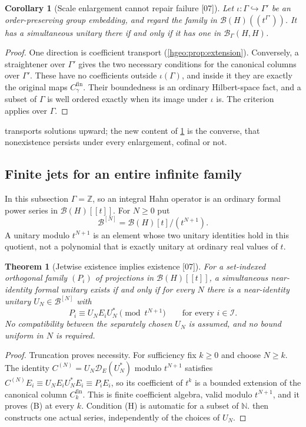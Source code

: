 \documentclass[11pt,letterpaper]{article}
\numberwithin{equation}{section}
\newtheorem{theorem}{Theorem}[section]
\newtheorem{corollary}[corollary]{Corollary}
\theoremstyle{definition}
\theoremstyle{remark}
\newcommand{\Z}{\mathbb Z}
\newcommand{\N}{\mathbb N}
\newcommand{\BH}{\mathscr B_\Gamma(H,H)}
\newcommand{\src}[1]{\textup{\textsf{\small[#1]}}}
\newcommand{\Dg}{\mathscr D}
\newcommand{\fin}{\mathrm{fin}}
\begin{document}
\begin{corollary}[Scale enlargement cannot repair failure \src{07}]
\label{hgeo:us:cor:extension}
Let $\iota:\Gamma\hookrightarrow\Gamma'$ be an order-preserving group
embedding, and regard the family in $\mathcal B(H)((t^{\Gamma'}))$. It has a
simultaneous unitary there if and only if it has one in $\BH$.
\end{corollary}
\begin{proof}
One direction is coefficient transport (\cref{hgeo:prop:extension}).
Conversely, a straightener over $\Gamma'$ gives the two necessary conditions
for the canonical columns over $\Gamma'$. These have no coefficients outside
$\iota(\Gamma)$, and inside it they are exactly the original maps
$C_\gamma^\fin$. Their boundedness is an ordinary Hilbert-space fact, and a
subset of $\Gamma$ is well ordered exactly when its image under $\iota$ is.
The criterion applies over $\Gamma$.
\end{proof}

 transports solutions upward; the new content of
\cref{hgeo:us:cor:extension} is the converse, that nonexistence persists under
every enlargement, cofinal or not.

\subsection{Finite jets for an entire infinite family}
In this subsection $\Gamma=\Z$, so an integral Hahn operator is an ordinary
formal power series in $\mathcal B(H)[[t]]$. For $N\ge0$ put
\[
 \mathscr B^{[N]}=\mathcal B(H)[t]/(t^{N+1}).
\]
A unitary modulo $t^{N+1}$ is an element whose two unitary identities hold in
this quotient, not a polynomial that is exactly unitary at ordinary real
values of $t$.

\begin{theorem}[Jetwise existence implies existence \src{07}]
\label{hgeo:us:thm:jets}
For a set-indexed orthogonal family $(P_i)$ of projections in
$\mathcal B(H)[[t]]$, a simultaneous near-identity formal unitary exists if and
only if for every $N$ there is a near-identity unitary
$U_N\in\mathscr B^{[N]}$ with
\[
 P_i\equiv U_NE_iU_N^*\pmod{t^{N+1}}\qquad\text{for every }i\in\mathcal I .
\]
No compatibility between the separately chosen $U_N$ is assumed, and no bound
uniform in $N$ is required.
\end{theorem}
\begin{proof}
Truncation proves necessity. For sufficiency fix $k\ge0$ and choose $N\ge k$.
The identity $C^{(N)}=U_N\Dg_E(U_N^*)$ modulo $t^{N+1}$ satisfies
$C^{(N)}E_i\equiv U_NE_iU_N^*E_i\equiv P_iE_i$, so its coefficient of $t^k$
is a bounded extension of the canonical column $C_k^\fin$. This is finite
coefficient algebra, valid modulo $t^{N+1}$, and it proves (B) at every $k$.
Condition (H) is automatic for a subset of $\N$. 
then constructs one actual series, independently of the choices of $U_N$.
\end{proof}
\end{document}
